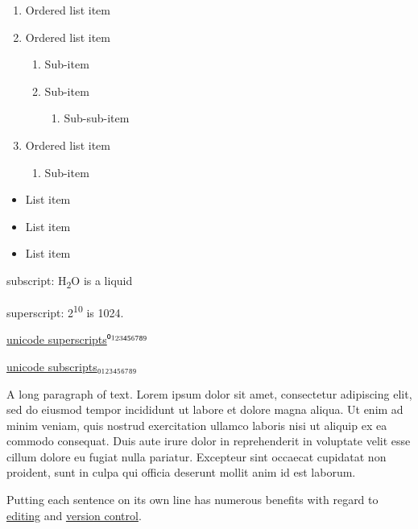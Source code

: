 \documentclass[
]{article}
\providecommand{\tightlist}{%
  \setlength{\itemsep}{0pt}\setlength{\parskip}{0pt}}
\begin{document}
\begin{enumerate}
\def\labelenumi{\arabic{enumi}.}
\tightlist
\item
  Ordered list item
\item
  Ordered list item

  \begin{enumerate}
  \def\labelenumii{\alph{enumii}.}
  \tightlist
  \item
    Sub-item
  \item
    Sub-item

    \begin{enumerate}
    \def\labelenumiii{\roman{enumiii}.}
    \tightlist
    \item
      Sub-sub-item
    \end{enumerate}
  \end{enumerate}
\item
  Ordered list item

  \begin{enumerate}
  \def\labelenumii{\alph{enumii}.}
  \tightlist
  \item
    Sub-item
  \end{enumerate}
\end{enumerate}

\begin{itemize}
\tightlist
\item
  List item
\item
  List item
\item
  List item
\end{itemize}

subscript: H\textsubscript{2}O is a liquid

superscript: 2\textsuperscript{10} is 1024.

\href{https://www.google.com/search?q=superscript+generator}{unicode superscripts}⁰¹²³⁴⁵⁶⁷⁸⁹

\href{https://www.google.com/search?q=superscript+generator}{unicode subscripts}₀₁₂₃₄₅₆₇₈₉

A long paragraph of text.
Lorem ipsum dolor sit amet, consectetur adipiscing elit, sed do eiusmod tempor incididunt ut labore et dolore magna aliqua.
Ut enim ad minim veniam, quis nostrud exercitation ullamco laboris nisi ut aliquip ex ea commodo consequat.
Duis aute irure dolor in reprehenderit in voluptate velit esse cillum dolore eu fugiat nulla pariatur.
Excepteur sint occaecat cupidatat non proident, sunt in culpa qui officia deserunt mollit anim id est laborum.

Putting each sentence on its own line has numerous benefits with regard to \href{https://asciidoctor.org/docs/asciidoc-recommended-practices/\#one-sentence-per-line}{editing} and \href{https://rhodesmill.org/brandon/2012/one-sentence-per-line/}{version control}.
\end{document}

